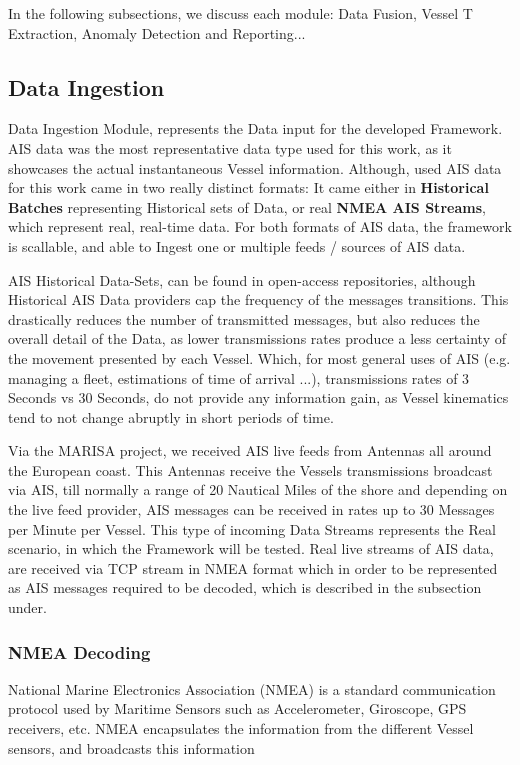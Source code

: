 In the following subsections, we discuss each module: Data Fusion, Vessel T Extraction, Anomaly Detection and Reporting...

\subsection{Data Ingestion}
Data Ingestion Module, represents the Data input for the developed Framework. AIS data was the most representative data type used for this work, as it showcases the actual instantaneous Vessel information.
Although, used AIS data for this work came in two really distinct formats: It came either in \textbf{Historical Batches} representing Historical sets of Data, or real \textbf{NMEA AIS Streams}, which represent real, real-time data. For both formats of AIS data, the framework is scallable, and able to Ingest one or multiple feeds / sources of AIS data.

AIS Historical Data-Sets, can be found in open-access repositories, although Historical AIS Data providers cap the frequency of the messages transitions. This drastically reduces the number of transmitted messages, but also reduces the overall detail of the Data, as lower transmissions rates produce a less certainty of the movement presented by each Vessel. Which, for most general uses of AIS (e.g. managing a fleet, estimations of time of arrival ...), transmissions rates of 3 Seconds vs 30 Seconds, do not provide any information gain, as Vessel kinematics tend to not change abruptly in short periods of time. 

Via the MARISA project, we received AIS live feeds from Antennas all around the European coast. This Antennas receive the Vessels transmissions broadcast via AIS, till normally a range of 20 Nautical Miles of the shore and depending on the live feed provider, AIS messages can be received in rates up to 30 Messages per Minute per Vessel. This type of incoming Data Streams represents the Real scenario, in which the Framework will be tested. Real live streams of AIS data, are received via TCP stream in NMEA format which in order to be represented as AIS messages required to be decoded, which is described in the subsection under.


\subsubsection{NMEA Decoding}
National Marine Electronics Association (NMEA) is a standard communication protocol used by Maritime Sensors such as Accelerometer, Giroscope, GPS receivers, etc.
NMEA encapsulates the information from the different Vessel sensors, and broadcasts this information

